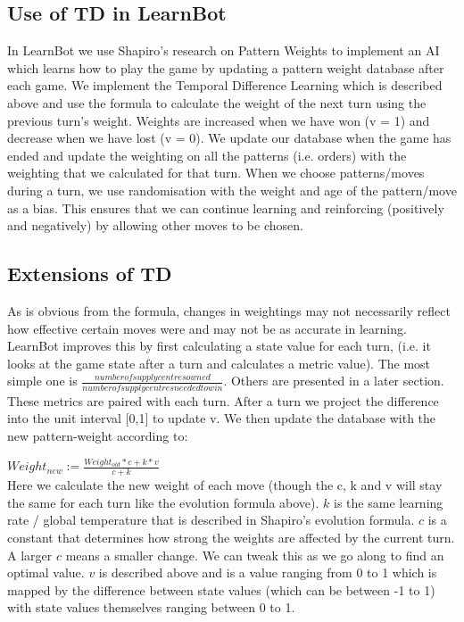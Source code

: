 \documentclass[pdftex,11pt,a4paper]{report}
\begin{document}
\subsection{Use of TD in LearnBot}
In LearnBot we use Shapiro's research on Pattern Weights
\cite{Shapiro02} to implement an AI which learns how to play the game
by updating a pattern weight database after each game.  We implement
the Temporal Difference Learning which is described above and use the
formula to calculate the weight of the next turn using the previous
turn's weight.  Weights are increased when we have won (v = 1) and
decrease when we have lost (v = 0). We update our database when the
game has ended and update the weighting on all the patterns
(i.e. orders) with the weighting that we calculated for that turn.
When we choose patterns/moves during a turn, we use randomisation
with the weight and age of the pattern/move as a bias. This ensures
that we can continue learning and reinforcing (positively and
negatively) by allowing other moves to be chosen.

\subsection{Extensions of TD}
As is obvious from the formula, changes in weightings may not
necessarily reflect how effective certain moves were and may
not be as accurate in learning. LearnBot improves this by first
calculating a state value for each turn, (i.e. it looks at the game
state after a turn and calculates a metric value). The most simple one
is $\frac{number of supply centres owned}{number of supply centres
  needed to win}$. Others are presented in a later section. These metrics
are paired with each turn. After a turn we project the difference into
the unit interval [0,1] to update v. We then update the database
with the new pattern-weight according to:

$Weight_{new} := \frac{Weight_{old}*c+k*v}{c+k}$ \\

Here we calculate the new weight of each move (though the c, k and
v will stay the same for each turn like the evolution formula above).
$k$ is the same learning rate / global temperature that is described in
Shapiro's evolution formula. $c$ is a constant that determines how
strong the weights are affected by the current turn. A larger $c$ means
a smaller change. We can tweak this as we go along to find an optimal value.
$v$ is described above and is a value ranging from 0 to 1 which is mapped
by the difference between state values (which can be between -1 to 1)
with state values themselves ranging between 0 to 1.
\end{document}
